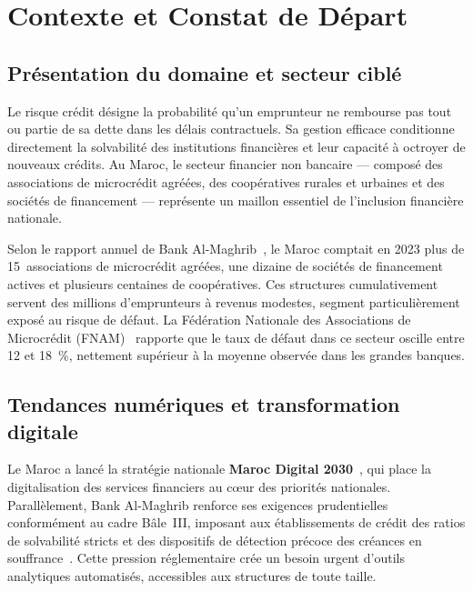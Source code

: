 \documentclass[12pt, a4paper]{report}
\begin{document}
\section{Contexte et Constat de Départ}

\subsection{Présentation du domaine et secteur ciblé}

Le risque crédit désigne la probabilité qu'un emprunteur ne rembourse pas tout ou
partie de sa dette dans les délais contractuels. Sa gestion efficace conditionne
directement la solvabilité des institutions financières et leur capacité à octroyer de
nouveaux crédits. Au Maroc, le secteur financier non bancaire --- composé des
associations de microcrédit agréées, des coopératives rurales et urbaines et des
sociétés de financement --- représente un maillon essentiel de l'inclusion financière
nationale.

Selon le rapport annuel de Bank Al-Maghrib~\cite{bam_rapport}, le Maroc comptait en
2023 plus de 15~associations de microcrédit agréées, une dizaine de sociétés de
financement actives et plusieurs centaines de coopératives. Ces structures
cumulativement servent des millions d'emprunteurs à revenus modestes, segment
particulièrement exposé au risque de défaut. La Fédération Nationale des
Associations de Microcrédit (FNAM)~\cite{fnam} rapporte que le taux de défaut dans
ce secteur oscille entre 12 et 18~\%, nettement supérieur à la moyenne observée dans
les grandes banques.

\subsection{Tendances numériques et transformation digitale}

Le Maroc a lancé la stratégie nationale \textbf{Maroc Digital 2030}~\cite{maroc_digital},
qui place la digitalisation des services financiers au c\oe ur des priorités nationales.
Parallèlement, Bank Al-Maghrib renforce ses exigences prudentielles conformément au
cadre Bâle~III, imposant aux établissements de crédit des ratios de solvabilité stricts
et des dispositifs de détection précoce des créances en souffrance~\cite{bam_rapport}.
Cette pression réglementaire crée un besoin urgent d'outils analytiques automatisés,
accessibles aux structures de toute taille.
\end{document}
